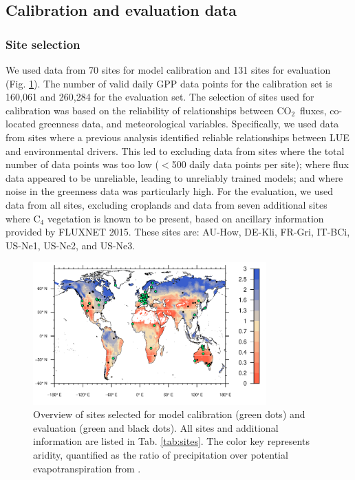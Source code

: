 \documentclass{myreport}
\newcommand{\coo}{CO$_2$}
\begin{document}
\subsection{Calibration and evaluation data}

\label{sec:calibdata}

\subsubsection{Site selection}
We used data from 70 sites for model calibration and 131 sites for evaluation (Fig. \ref{fig:map_sites}). The number of valid daily GPP data points for the calibration set is 160,061 and 260,284 for the evaluation set. The selection of sites used for calibration was based on the reliability of relationships between \coo\ fluxes, co-located greenness data, and meteorological variables. Specifically, we used data from sites where a previous analysis \citep{stocker18newphyt} identified reliable relationships between LUE and environmental drivers. This led to excluding data from sites where the total number of data points was too low ($<$500 daily data points per site); where flux data appeared to be unreliable, leading to unreliably trained models; and where noise in the greenness data was particularly high. For the evaluation, we used data from all sites, excluding croplands and data from seven additional sites where C$_4$ vegetation is known to be present, based on ancillary information provided by FLUXNET 2015. These sites are: AU-How, DE-Kli, FR-Gri, IT-BCi, US-Ne1, US-Ne2, and US-Ne3.

\begin{figure}[!ht]
    \centering
    \includegraphics[width=0.8\textwidth]{fig/map_sites.pdf}
    \caption{Overview of sites selected for model calibration (green dots) and evaluation (green and black dots). All sites and additional information are listed in Tab. \ref{tab:sites}. The color key represents aridity, quantified as the ratio of precipitation over potential evapotranspiration from \citet{greve14}.}
    \label{fig:map_sites}
\end{figure}
\end{document}
